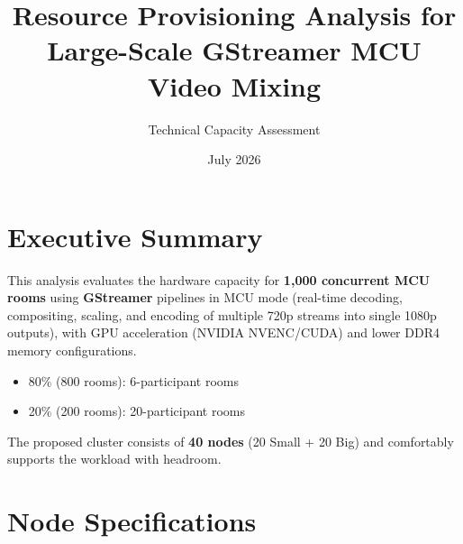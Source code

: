 \documentclass{article}
\title{\textbf{Resource Provisioning Analysis for Large-Scale GStreamer MCU Video Mixing}}
\author{Technical Capacity Assessment}
\date{July 2026}
\begin{document}
\maketitle

\section{Executive Summary}
This analysis evaluates the hardware capacity for \textbf{1,000 concurrent MCU rooms} using \textbf{GStreamer} pipelines in MCU mode (real-time decoding, compositing, scaling, and encoding of multiple 720p streams into single 1080p outputs), with GPU acceleration (NVIDIA NVENC/CUDA) and lower DDR4 memory configurations.

\begin{itemize}
    \item 80\% (800 rooms): 6-participant rooms
    \item 20\% (200 rooms): 20-participant rooms
\end{itemize}

The proposed cluster consists of \textbf{40 nodes} (20 Small + 20 Big) and comfortably supports the workload with headroom.

\section{Node Specifications}

\begin{table}[htbp]
\centering
\caption{Node Types and Specifications (GPU-Accelerated, Lower DDR4)}
\noindent{}
\end{table}
\end{document}
